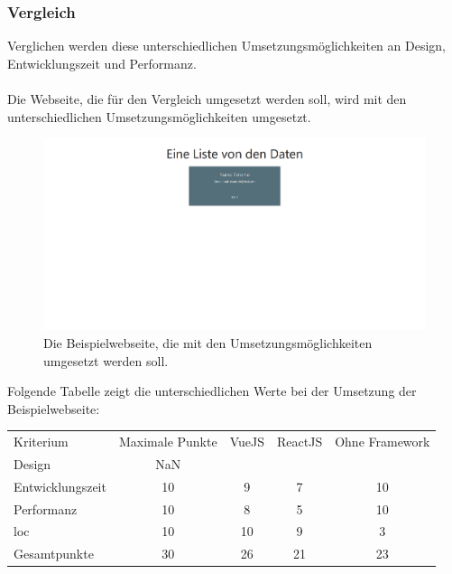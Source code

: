 \subsubsection{Vergleich}
Verglichen werden diese unterschiedlichen Umsetzungsmöglichkeiten an Design, Entwicklungszeit und Performanz.\\\\
Die Webseite, die für den Vergleich umgesetzt werden soll, wird mit den unterschiedlichen Umsetzungsmöglichkeiten umgesetzt.\\
\begin{figure}[H]
	\centering
	\includegraphics[width=0.8\linewidth]{images/example_page}
	\caption[Die Beispielwebseite]{Die Beispielwebseite, die mit den Umsetzungsmöglichkeiten umgesetzt werden soll.}
	\label{fig:example}
\end{figure}
Folgende Tabelle zeigt die unterschiedlichen Werte bei der Umsetzung der Beispielwebseite:
\begin{table}
	\centering
	\label{center}
	\begin{tabular}{lcccc}
		Kriterium        & \multicolumn{1}{l}{Maximale Punkte} & \multicolumn{1}{l}{VueJS} & \multicolumn{1}{l}{ReactJS} & \multicolumn{1}{l}{Ohne Framework}  \\
		Design           & NaN                        &            \checkmark               &             \checkmark              &          \checkmark                           \\
		Entwicklungszeit & 10                         &             9              &               7            &               10                      \\
		Performanz       & 10                         &             8              &               5            &                 10                    \\
		\gls{loc}              & 10                         &             10              &               9            &                   3                  \\
		Gesamtpunkte     & 30                         &              26             &               21            &                23                    
	\end{tabular}
\end{table}
